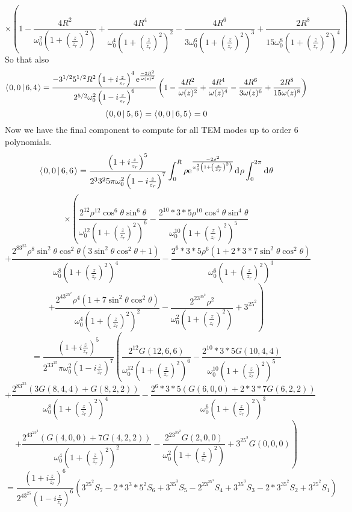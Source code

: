 \documentclass[11pt]{amsart}
\makeatletter
\newcommand{\e}{{\rm e}}				%
\newcommand{\msp}[1]{\mspace{#1mu}}		%
\newcommand{\0}{\varnothing}		%
\newcommand{\dd}{\msp{1} {\rm{d}} \msp{1}}	%
\newcommand{\brac}[2]{\left\langle\msp{2} #1\left\lvert \msp{3.5} #2 \right.\right\rangle}	%
\newcommand{\1}{!}
\newcommand{\2}{@}
\newcommand{\3}{\#}
\newcommand{\4}{\$}
\newcommand{\5}{\%}
\newcommand{\6}{$^\wedge$}
\newcommand{\7}{\&}
\newcommand{\8}{*}
\newcommand{\9}{(}
\makeatother
\begin{document}
\[
\times\left(1-\frac{4R^2}{\omega_0^2\left(1+\left(\frac{z}{z_r}\right)^2\right)}+\frac{4R^4}{\omega_0^4\left(1+\left(\frac{z}{z_r}\right)^2\right)^2}-\frac{4R^6}{3\omega_0^6\left(1+\left(\frac{z}{z_r}\right)^2\right)^3}+\frac{2R^8}{15\omega_0^8\left(1+\left(\frac{z}{z_r}\right)^2\right)^4}\right)
\]
So that also
\[
\brac{0,0}{6,4} = \frac{-3^{1/2}5^{1/2}R^2\left(1+i\frac{z}{z_r}\right)^4\e^{\frac{-2R^2}{\omega(z)^2}}}{2^{5/2}\omega_0^2\left(1-i\frac{z}{z_r}\right)^6}\left(1-\frac{4R^2}{\omega(z)^2}+\frac{4R^4}{\omega(z)^4}-\frac{4R^6}{3\omega(z)^6}+\frac{2R^8}{15\omega(z)^8}\right)
\]
\[
\brac{0,0}{5,6} = \brac{0,0}{6,5} = 0
\]
Now we have the final component to compute for all TEM modes up to order 6 polynomials.
\[
\brac{0,0}{6,6} = \frac{\left(1+i\frac{z}{z_r}\right)^5}{2^33^25\pi\omega_0^2\left(1-i\frac{z}{z_r}\right)^7}\int_0^R \rho \e^{\frac{-2\rho^2}{\omega_0^2\left(1+\left(\frac{z}{z_r}\right)^2\right)}}\dd \rho \int_0^{2\pi} \dd \theta
\]
\[
\times\left(\frac{2^{12}\rho^{12}\cos^6\theta \sin^6\theta}{\omega_0^{12}\left(1+\left(\frac{z}{z_r}\right)^2\right)^6}-\frac{2^{10}*3*5\rho^{10}\cos^4\theta\sin^4\theta}{\omega_0^{10}\left(1+\left(\frac{z}{z_r}\right)^2\right)^5}\right.
\]
\[
\left. + \frac{2^83^25\rho^8\sin^2\theta\cos^2\theta\left(3\sin^2\theta\cos^2\theta+1\right)}{\omega_0^8\left(1+\left(\frac{z}{z_r}\right)^2\right)^4}-\frac{2^6*3*5\rho^6\left(1+2*3*7\sin^2\theta \cos^2\theta\right)}{\omega_0^6\left(1+\left(\frac{z}{z_r}\right)^2\right)^3}
\right.
\]
\[
\left.+\frac{2^43^25^2\rho^4\left(1+7\sin^2\theta\cos^2\theta\right)}{\omega_0^4\left(1+\left(\frac{z}{z_r}\right)^2\right)^2}-\frac{2^23^35^2\rho^2}{\omega_0^2\left(1+\left(\frac{z}{z_r}\right)^2\right)}+3^25^2\right)
\]
\[
=\frac{\left(1+i\frac{z}{z_r}\right)^5}{2^33^25\pi\omega_0^2\left(1-i\frac{z}{z_r}\right)^7}\left(\frac{2^{12}G(12,6,6)}{\omega_0^{12}\left(1+\left(\frac{z}{z_r}\right)^2\right)^6}-\frac{2^{10}*3*5G(10,4,4)}{\omega_0^{10}\left(1+\left(\frac{z}{z_r}\right)^2\right)^5}\right.
\]
\[
\left. +\frac{2^83^25\left(3G(8,4,4)+G(8,2,2)\right)}{\omega_0^8\left(1+\left(\frac{z}{z_r}\right)^2\right)^4}-\frac{2^6*3*5\left(G(6,0,0)+2*3*7G(6,2,2)\right)}{\omega_0^6\left(1+\left(\frac{z}{z_r}\right)^2\right)^3}\right.
\]
\[
\left. +\frac{2^43^25^2\left(G(4,0,0)+7G(4,2,2)\right)}{\omega_0^4\left(1+\left(\frac{z}{z_r}\right)^2\right)^2}-\frac{2^23^35^2G(2,0,0)}{\omega_0^2\left(1+\left(\frac{z}{z_r}\right)^2\right)}+3^25^2G(0,0,0)\right)
\]
\[
=\frac{\left(1+i\frac{z}{z_r}\right)^6}{2^43^25\left(1-i\frac{z}{z_r}\right)^6}\left(3^25^2S_7-2*3^3*5^2S_6+3^35^3S_5-2^23^25^3S_4+3^35^3S_3-2*3^35^2S_2+3^25^2S_1\right)
\]
\end{document}
